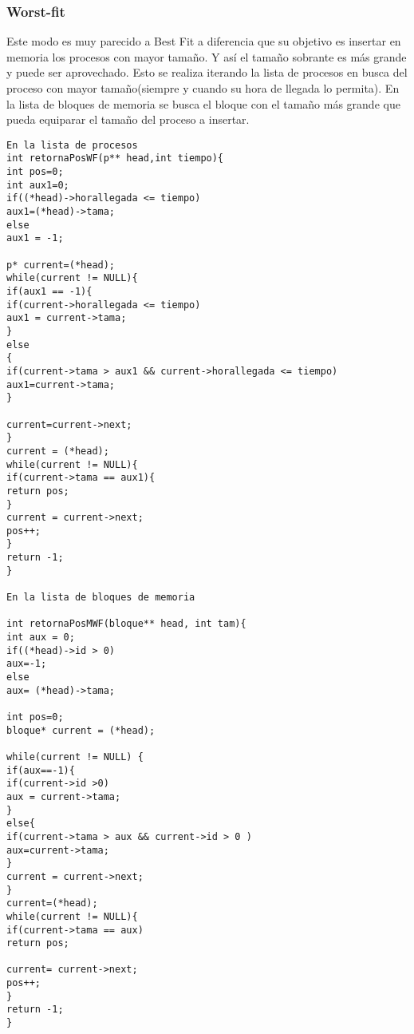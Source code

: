 \documentclass[10pt,a4paper]{article}
\begin{document}
\subsubsection{Worst-fit}
Este modo es muy parecido a Best Fit a diferencia que su objetivo es insertar en memoria los procesos con mayor tamaño. Y así el tamaño sobrante es más grande y puede ser aprovechado.
Esto se realiza iterando la lista de procesos en busca del proceso con mayor tamaño(siempre y cuando su hora de llegada lo permita).
En la lista de bloques de memoria se busca el bloque con el tamaño más grande que pueda equiparar el tamaño del proceso a insertar.
\begin{verbatim}
En la lista de procesos
int retornaPosWF(p** head,int tiempo){
int pos=0;
int aux1=0;
if((*head)->horallegada <= tiempo)
aux1=(*head)->tama;
else 
aux1 = -1;

p* current=(*head);
while(current != NULL){
if(aux1 == -1){
if(current->horallegada <= tiempo)
aux1 = current->tama;
}
else
{
if(current->tama > aux1 && current->horallegada <= tiempo)
aux1=current->tama;
}

current=current->next;
}
current = (*head);
while(current != NULL){
if(current->tama == aux1){
return pos;
}
current = current->next;
pos++;
}
return -1;
}

En la lista de bloques de memoria

int retornaPosMWF(bloque** head, int tam){
int aux = 0;
if((*head)->id > 0)
aux=-1;
else 
aux= (*head)->tama;

int pos=0;
bloque* current = (*head);

while(current != NULL) {
if(aux==-1){
if(current->id >0)
aux = current->tama;
}
else{
if(current->tama > aux && current->id > 0 )
aux=current->tama;
}
current = current->next;
}
current=(*head);
while(current != NULL){
if(current->tama == aux)
return pos;

current= current->next;
pos++;
}
return -1;
}  
\end{verbatim}
\end{document}
